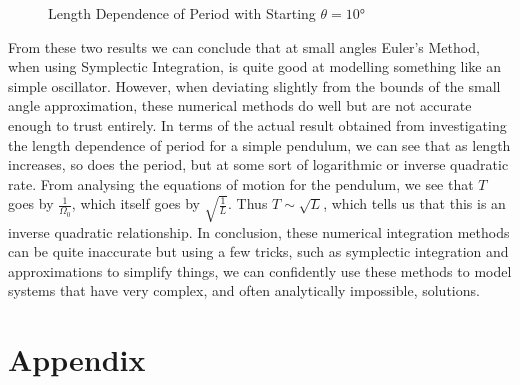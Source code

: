 \documentclass[12pt]{article}
\begin{document}
    \begin{figure}[H]
        \begin{center}
           \scalebox{.7}{}
           \caption{Length Dependence of Period with Starting $\theta = \ang{10}$}
           \label{fig:lengthperiod10}
        \end{center}
    \end{figure}
    
    \noindent
    From these two results we can conclude that at small angles Euler's Method, when using Symplectic 
    Integration, is quite good at modelling something like an simple oscillator. However, when 
    deviating slightly from the bounds of the small angle approximation, these numerical methods 
    do well but are not accurate enough to trust entirely. 
    \newline
    In terms of the actual result obtained from investigating the length dependence of period for 
    a simple pendulum, we can see that as length increases, so does the period, but at some sort of 
    logarithmic or inverse quadratic rate. From analysing the equations of motion for the pendulum, 
    we see that $T$ goes by $\frac{1}{\Omega_0}$, which itself goes by $\sqrt{\frac{1}{L}}$. Thus 
    $T \sim \sqrt{L}$, which tells us that this is an inverse quadratic relationship. 
    \newline
    \newline
    In conclusion, these numerical integration methods can be quite inaccurate but using a few tricks, 
    such as symplectic integration and approximations to simplify things, we can confidently use 
    these methods to model systems that have very complex, and often analytically impossible, solutions. 
    

    \newpage
    \section{Appendix}
    \setcounter{figure}{0} \renewcommand{\thefigure}{A.\arabic{figure}}

    
    
    
\end{document}
